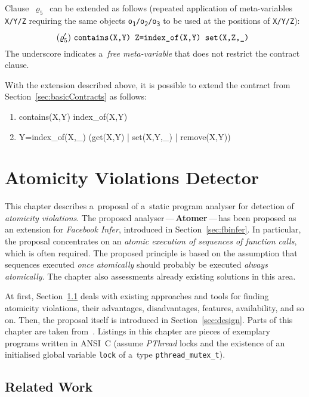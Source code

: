 Clause~$ \varrho_5 $~can be extended as follows (repeated application of
meta-variables \texttt{X/Y/Z} requiring the same objects
\texttt{o\textsubscript{1}/o\textsubscript{2}/o\textsubscript{3}} to be used
at the positions of \texttt{X/Y/Z}):
$$
    (\varrho^\prime_5)\ \text{\texttt{%
        contains(X,Y) Z=index\_of(X,Y) set(X,Z,\_)
    }}
$$
The underscore indicates a~\emph{free meta-variable} that does not restrict
the contract clause.

With the extension described above, it is possible to extend the contract
from Section~\ref{sec:basicContracts} as follows:
\begin{enumerate}[label={$ (\varrho^\prime_{\arabic*}) $}]
    \tt

    \item contains(X,Y) index\_of(X,Y)
    \item Y=index\_of(X,\_) (get(X,Y) | set(X,Y,\_) | remove(X,Y))
\end{enumerate}



\chapter{Atomicity Violations Detector}
\label{chap:proposal}

This chapter describes a~proposal of a~static program analyser for
detection of \emph{atomicity violations}. The proposed
analyser\,---\,\textbf{Atomer}\,---\,has been proposed as an extension
for \emph{Facebook Infer}, introduced in Section~\ref{sec:fbinfer}. In
particular, the proposal concentrates on an \emph{atomic execution of
sequences of function calls}, which is often required. The
proposed principle is based on the assumption that sequences executed
\emph{once atomically} should probably be executed \emph{always atomically}.
The chapter also assessments already existing solutions in this area.

At first, Section~\ref{sec:relWork} deals with
existing approaches and tools for finding atomicity violations, their
advantages, disadvantages, features, availability, and so on. Then,
the proposal itself is introduced in Section~\ref{sec:design}. Parts of
this chapter are taken from~\cite{excel2019FBInfer}. Listings in this
chapter are pieces of exemplary programs written in ANSI~C (assume
\emph{PThread} locks and the existence of an initialised global variable
\texttt{lock} of a~type \texttt{pthread\_mutex\_t}).


\section{Related Work}
\label{sec:relWork}

